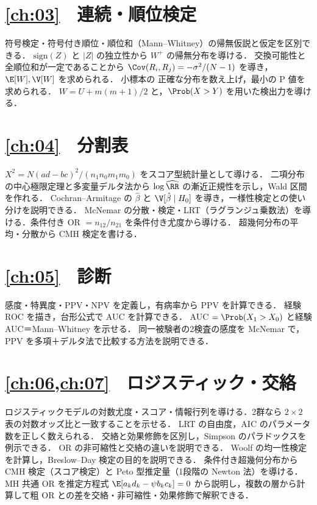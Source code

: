 \section*{\cref{ch:03}　連続・順位検定}
\begin{itemize}
\chk 符号検定・符号付き順位・順位和（Mann--Whitney）の帰無仮説と仮定を区別できる．
\chk $\mathrm{sign}(Z)$ と $|Z|$ の独立性から $W^+$ の帰無分布を導ける．
\chk 交換可能性と全順位和が一定であることから $\Cov(R_i,R_j)=-\sigma^2/(N-1)$ を導き，$\E[W],\V[W]$ を求められる．
\chk 小標本の 正確な分布を数え上げ，最小の P 値を求められる．
\chk $W=U+m(m+1)/2$ と，$\Prob(X>Y)$ を用いた検出力を導ける．
\end{itemize}
\section*{\cref{ch:04}　分割表}
\begin{itemize}
\chk $X^2=N(ad-bc)^2/(n_1n_0m_1m_0)$ をスコア型統計量として導ける．
\chk 二項分布の中心極限定理と多変量デルタ法から $\log\widehat{\RR}$ の漸近正規性を示し，Wald 区間を作れる．
\chk Cochran--Armitage の $\hat\beta$ と $\V[\hat\beta\mid H_0]$ を導き，一様性検定との使い分けを説明できる．
\chk McNemar の分散・検定・LRT（ラグランジュ乗数法）を導ける．条件付き OR $=n_{12}/n_{21}$ を条件付き尤度から導ける．
\chk 超幾何分布の平均・分散から CMH 検定を書ける．
\end{itemize}
\section*{\cref{ch:05}　診断}
\begin{itemize}
\chk 感度・特異度・PPV・NPV を定義し，有病率から PPV を計算できる．
\chk 経験 ROC を描き，台形公式で AUC を計算できる．
\chk AUC $=\Prob(X_1>X_0)$ と経験 AUC＝Mann--Whitney を示せる．
\chk 同一被験者の2検査の感度を McNemar で，PPV を多項＋デルタ法で比較する方法を説明できる．
\end{itemize}
\section*{\cref{ch:06,ch:07}　ロジスティック・交絡}
\begin{itemize}
\chk ロジスティックモデルの対数尤度・スコア・情報行列を導ける．2群なら $2\times2$ 表の対数オッズ比と一致することを示せる．
\chk LRT の自由度，AIC のパラメータ数を正しく数えられる．
\chk 交絡と効果修飾を区別し，Simpson のパラドックスを例示できる．
\chk OR の非可縮性と交絡の違いを説明できる．
\chk Woolf の均一性検定を計算し，Breslow--Day 検定の目的を説明できる．
\chk 条件付き超幾何分布から CMH 検定（スコア検定）と Peto 型推定量（1段階の Newton 法）を導ける．
\chk MH 共通 OR を推定方程式 $\E[a_kd_k-\psi b_kc_k]=0$ から説明し，複数の層から計算して粗 OR との差を交絡・非可縮性・効果修飾で解釈できる．
\end{itemize}
